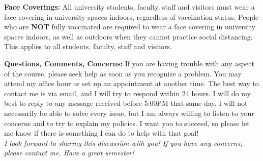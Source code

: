 \documentclass[12pt]{article}
\begin{document}
\textbf{Face Coverings:} All university students, faculty, staff and visitors must wear a face covering in university spaces indoors, regardless of vaccination status. People who are \textbf{NOT} fully vaccinated are required to wear a face covering in university spaces indoors, as well as outdoors when they cannot practice social distancing. This applies to all students, faculty, staff and visitors. 
	

\noindent \textbf{Questions, Comments, Concerns:} If you are having trouble with any aspect of the course, please seek help as soon as you recognize a problem. You may attend my office hour or set up an appointment at another time. The best way to contact me is via email, and I will try to respond within 24 hours. I will do my best to reply to any message received before 5:00PM that same day. I will not necessarily be able to solve every issue, but I am always willing to listen to your concerns and to try to explain my policies. I want you to succeed, so please let me know if there is something I can do to help with that goal! \\


\emph{I look forward to sharing this discussion with you! If you have any concerns, please contact me.  Have a great semester!}
\end{document}
